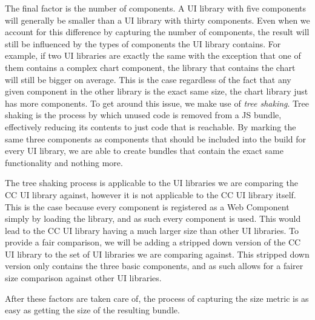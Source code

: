The final factor is the number of components. A UI library with five components will generally be smaller than a UI library with thirty components. Even when we account for this difference by capturing the number of components, the result will still be influenced by the types of components the UI library contains. For example, if two UI libraries are exactly the same with the exception that one of them contains a complex chart component, the library that contains the chart will still be bigger on average. This is the case regardless of the fact that any given component in the other library is the exact same size, the chart library just has more components. To get around this issue, we make use of \emph{tree shaking}. Tree shaking is the process by which unused code is removed from a JS bundle, effectively reducing its contents to just code that is reachable. By marking the same three components as components that should be included into the build for every UI library, we are able to create bundles that contain the exact same functionality and nothing more.

The tree shaking process is applicable to the UI libraries we are comparing the CC UI library against, however it is not applicable to the CC UI library itself. This is the case because every component is registered as a Web Component simply by loading the library, and as such every component is used. This would lead to the CC UI library having a much larger size than other UI libraries. To provide a fair comparison, we will be adding a stripped down version of the CC UI library to the set of UI libraries we are comparing against. This stripped down version only contains the three basic components, and as such allows for a fairer size comparison against other UI libraries.

After these factors are taken care of, the process of capturing the size metric is as easy as getting the size of the resulting bundle.


